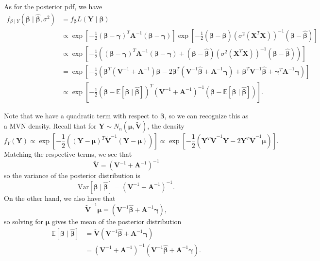 \begin{enumerate}[a)]
As for the posterior pdf, we have 
\begin{align*}
    f_{\beta \mid Y}(\bm{\beta} \mid \hat{\bm{\beta}}, \sigma^2) &= f_{\bm{\beta}} L(\bm{Y} \mid \bm{\beta}) \\
    & \propto \exp \left[ -\frac{1}{2} (\bm{\beta} - \bm{\gamma})^T \bm{A}^{-1} (\bm{\beta} - \bm{\gamma}) \right] \exp \left[ -\frac{1}{2} (\bm{\beta} - \hat{\bm{\beta}})\left(\sigma^2(\bm{X}^T\bm{X})\right)^{-1}(\bm{\beta} - \hat{\bm{\beta}}) \right] \\
    & \propto \exp \left[ -\frac{1}{2} \left((\bm{\beta} - \bm{\gamma})^T \bm{A}^{-1} (\bm{\beta} - \bm{\gamma}) + (\bm{\beta} - \hat{\bm{\beta}})\left(\sigma^2(\bm{X}^T\bm{X})\right)^{-1}(\bm{\beta} - \hat{\bm{\beta}}) \right)\right] \\
    &= \exp \left[ -\frac{1}{2} \left(\bm{\beta}^T(\bm{V}^{-1} + \bm{A}^{-1})\bm{\beta} - 2\bm{\beta}^T (\bm{V}^{-1} \hat{\bm{\beta}} + \bm{A}^{-1} \bm{\gamma}) + \bm{\beta}^T \bm{V}^{-1} \hat{\bm{\beta}} + \bm{\gamma}^T \bm{A}^{-1}\bm{\gamma} \right) \right] \\
    & \propto \exp \left[ -\frac{1}{2} \left(\bm{\beta} - \mathbb{E}\left[\bm{\beta} \mid \hat{\bm{\beta}}\right] \right)^T (\bm{V}^{-1} + \bm{A}^{-1})^{-1} \left(\bm{\beta} - \mathbb{E}\left[\bm{\beta} \mid \hat{\bm{\beta}}\right] \right) \right].
\end{align*}

Note that we have a quadratic term with respect to $\bm{\beta}$, so we can recognize this as a MVN density. Recall that for $\bm{Y} \sim N_n(\bm{\mu}, \tilde{\bm{V}})$, the density
\[
    f_Y(\bm{Y}) \propto \exp \left[  -\frac{1}{2} \left( (\bm{Y} - \bm{\mu}) ^T \tilde{\bm{V}}^{-1} (\bm{Y} - \bm{\mu}) \right) \right] \propto \exp \left[ -\frac{1}{2} \left( \bm{Y}^T \tilde{\bm{V}}^{-1} \bm{Y} - 2 \bm{Y}^T \tilde{\bm{V}}^{-1} \bm{\mu} \right)  \right].
\]
Matching the respective terms, we see that 
\[
    \tilde{\bm{V}} = (\bm{V}^{-1} + \bm{A}^{-1})^{-1}
\]
so the variance of the posterior distribution is
\[
    \mathrm{Var} \left[\bm{\beta} \mid \hat{\bm{\beta}} \right] = (\bm{V}^{-1} + \bm{A}^{-1})^{-1}.
\]
On the other hand, we also have that
\[
    \tilde{\bm{V}}^{-1} \bm{\mu} = (\bm{V}^{-1} \hat{\bm{\beta}} + \bm{A}^{-1} \bm{\gamma}),
\]
so solving for $\bm{\mu}$ gives the mean of the posterior distribution
\begin{align*}
    \mathbb{E}\left[ \bm{\beta} \mid \hat{\bm{\beta}} \right] &= \tilde{\bm{V}}(\bm{V}^{-1} \hat{\bm{\beta}} + \bm{A}^{-1} \bm{\gamma}) \\
    &= (\bm{V}^{-1} + \bm{A}^{-1})^{-1}(\bm{V}^{-1} \hat{\bm{\beta}} + \bm{A}^{-1} \bm{\gamma}).
\end{align*}


\end{enumerate}
